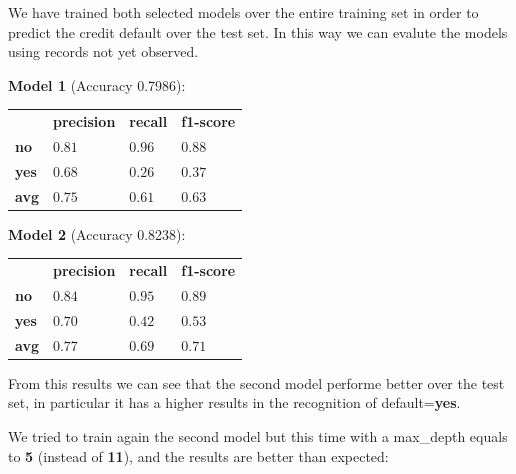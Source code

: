 We have trained both selected models over the entire training set in order to predict the credit default over the test set. In this way we can evalute the models using records not yet observed.

\medskip

\textbf{Model 1} (Accuracy 0.7986):

\begin{table}[h]
\centering
\begin{adjustbox}{width=.30\textwidth}
\small
\begin{tabular}{llll}
               & \textbf{precision} & \textbf{recall} & \textbf{f1-score} \\ \rowcolor[HTML]{EFEFEF} 
 \textbf{no}   &  $0.81$            & $0.96$          & $0.88$            \\
 \textbf{yes}  &  $0.68$            & $0.26$          & $0.37$            \\ \rowcolor[HTML]{EFEFEF} 
 \textbf{avg}  &  $0.75$            & $0.61$          & $0.63$            \\
\end{tabular}
\end{adjustbox}
\end{table}

\medskip

\textbf{Model 2} (Accuracy 0.8238):

\begin{table}[h]
\centering
\begin{adjustbox}{width=.30\textwidth}
\small
\begin{tabular}{llll}
               & \textbf{precision} & \textbf{recall} & \textbf{f1-score} \\ \rowcolor[HTML]{EFEFEF} 
 \textbf{no}   &  $0.84$            & $0.95$          & $0.89$            \\
 \textbf{yes}  &  $0.70$            & $0.42$          & $0.53$            \\ \rowcolor[HTML]{EFEFEF} 
 \textbf{avg}  &  $0.77$            & $0.69$          & $0.71$            \\
\end{tabular}
\end{adjustbox}
\end{table}


From this results we can see that the second model performe better over the test set, in particular it has a higher results in the recognition of default=\textbf{yes}.

We tried to train again the second model but this time with a max\_depth equals to \textbf{5} (instead of \textbf{11}), and the results are better than expected:


